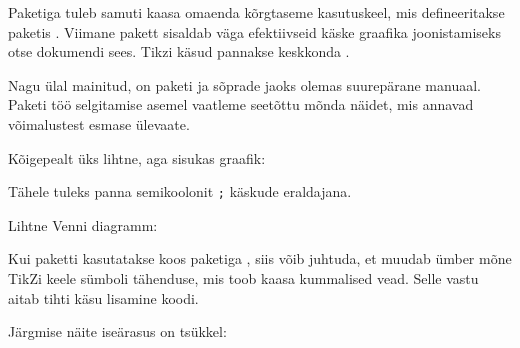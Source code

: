 Paketiga  tuleb samuti kaasa omaenda kõrgtaseme kasutuskeel,
mis defineeritakse paketis . Viimane pakett sisaldab väga
efektiivseid käske graafika joonistamiseks otse dokumendi sees. Tikzi
käsud pannakse keskkonda .

Nagu ülal mainitud, on paketi  ja sõprade jaoks olemas
suurepärane manuaal. Paketi töö selgitamise asemel vaatleme seetõttu
mõnda näidet, mis annavad võimalustest esmase ülevaate.

Kõigepealt üks lihtne, aga sisukas graafik:
\begin{example}
\end{example}
\noindent Tähele tuleks panna semikoolonit \texttt{;} käskude
eraldajana.

Lihtne Venni diagramm:
\begin{example}
\shorthandoff{:}
\end{example}
Kui paketti  kasutatakse koos paketiga , siis võib
juhtuda, et  muudab ümber mõne TikZi keele sümboli tähenduse,
mis toob kaasa kummalised vead. Selle vastu aitab tihti käsu
 lisamine koodi.

Järgmise näite iseärasus on tsükkel:

\begin{example}
\end{example}


